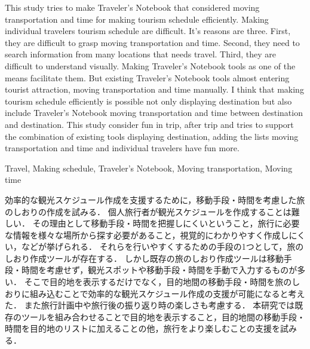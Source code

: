 \documentclass{funthesis}
\begin{document}
\maketitle       %

\begin{eabstract}
This study tries to make Traveler's Notebook that considered moving transportation and time for making tourism schedule efficiently.
Making individual travelers tourism schedule are difficult.
It's reasons are three. First, they are difficult to grasp moving transportation and time. Second, they need to search information from many locations that needs travel. Third,  they are difficult to understand visually.
Making Traveler's Notebook tools as one of the means facilitate them.
But existing Traveler's Notebook tools almost entering tourist attraction, moving transportation and time manually.
I think that making tourism schedule efficiently is possible not only displaying destination but also include Traveler's Notebook moving transportation and time between destination and destination.
This study consider fun in trip, after trip 
and tries to support the combination of existing tools displaying destination, adding the lists moving transportation and time and individual travelers have fun more.

\end{eabstract}

\begin{ekeyword}
Travel, Making schedule, Traveler's Notebook, Moving transportation, Moving time
\end{ekeyword}

\begin{jabstract}
効率的な観光スケジュール作成を支援するために，移動手段・時間を考慮した旅のしおりの作成を試みる．
個人旅行者が観光スケジュールを作成することは難しい．
その理由として移動手段・時間を把握しにくいということ，旅行に必要な情報を様々な場所から探す必要があること，視覚的にわかりやすく作成しにくい，などが挙げられる．
それらを行いやすくするための手段の1つとして，旅のしおり作成ツールが存在する．
しかし既存の旅のしおり作成ツールは移動手段・時間を考慮せず，観光スポットや移動手段・時間を手動で入力するものが多い．
そこで目的地を表示するだけでなく，目的地間の移動手段・時間を旅のしおりに組み込むことで効率的な観光スケジュール作成の支援が可能になると考えた．
また旅行計画中や旅行後の振り返り時の楽しさも考慮する．
本研究では既存のツールを組み合わせることで目的地を表示すること，目的地間の移動手段・時間を目的地のリストに加えることの他，旅行をより楽しむことの支援を試みる．

\end{jabstract}
\end{document}

